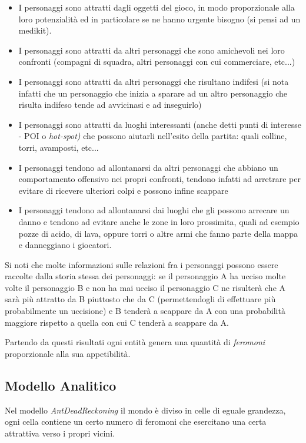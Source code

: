 \documentclass[a4paper,11pt]{article}
\begin{document}
\begin{itemize}
\item I personaggi sono attratti dagli oggetti del gioco, in modo proporzionale alla loro potenzialit\`a ed in particolare se ne hanno urgente bisogno (si pensi ad un medikit).
\item I personaggi sono attratti da altri personaggi che sono amichevoli nei loro confronti (compagni di squadra, altri personaggi con cui commerciare, etc...)
\item I personaggi sono attratti da altri personaggi che risultano indifesi (si nota infatti che un personaggio che inizia a sparare ad un altro personaggio che risulta indifeso tende ad avvicinasi e ad inseguirlo)
\item I personaggi sono attratti da luoghi interessanti (anche detti punti di interesse - POI o \emph{hot-spot)} che possono aiutarli nell'esito della partita: quali colline, torri, avamposti, etc...
\item I personaggi tendono ad allontanarsi da altri personaggi che abbiano un comportamento offensivo nei propri confronti, tendono infatti ad arretrare per evitare di ricevere ulteriori colpi e possono infine scappare
\item I personaggi tendono ad allontanarsi dai luoghi che gli possono arrecare un danno e tendono ad evitare anche le zone in loro prossimita, quali ad esempio pozze di acido, di lava, oppure torri o altre armi che fanno parte della mappa e danneggiano i giocatori.
\end{itemize}

Si noti che molte informazioni sulle relazioni fra i personaggi possono essere raccolte dalla storia stessa dei personaggi: se il personaggio A ha ucciso molte volte il personaggio B e non ha mai ucciso il personaggio C ne risulter\`a che A sar\`a pi\`u attratto da B piuttosto che da C (permettendogli di effettuare pi\`u probabilmente un uccisione) e B tender\`a a scappare da A con una probabilit\`a maggiore rispetto a quella con cui C tender\`a a scappare da A.

Partendo da questi risultati ogni entit\`a genera una quantit\`a di \emph{feromoni} proporzionale alla sua appetibilit\`a.

\subsection{Modello Analitico}

Nel modello \emph{AntDeadReckoning} il mondo \`e diviso in celle di eguale grandezza, ogni cella contiene un certo numero di feromoni che esercitano una certa attrattiva verso i propri vicini.
\end{document}
